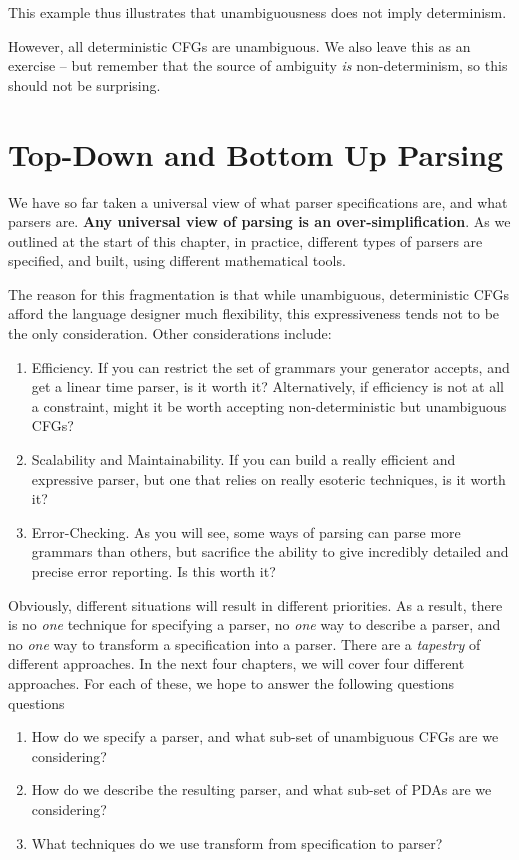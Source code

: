 This example thus illustrates that unambiguousness does not imply determinism.

However, all deterministic CFGs are unambiguous. We also leave this as an exercise -- but remember that the source of ambiguity \textit{is} non-determinism, so this should not be surprising.

\section{Top-Down and Bottom Up Parsing}
We have so far taken a universal view of what parser specifications are, and what parsers are. \textbf{Any universal view of parsing is an over-simplification}. As we outlined at the start of this chapter, in practice, different types of parsers are specified, and built, using different mathematical tools.

The reason for this fragmentation is that while unambiguous, deterministic CFGs afford the language designer much flexibility, this expressiveness  tends not to be the only consideration. Other considerations include:

\begin{enumerate}
    \item Efficiency. If you can restrict the set of grammars your generator accepts, and get a linear time parser, is it worth it? Alternatively, if efficiency is not at all a constraint, might it be worth accepting non-deterministic but unambiguous CFGs?
    \item Scalability and Maintainability. If you can build a really efficient and expressive parser, but one that relies on really esoteric techniques, is it worth it?
    \item Error-Checking. As you will see, some ways of parsing can parse more grammars than others, but sacrifice the ability to give incredibly detailed and precise error reporting. Is this worth it?
\end{enumerate}

Obviously, different situations will result in different priorities. As a result, there is no \textit{one} technique for specifying a parser, no \textit{one} way to describe a parser, and no \textit{one} way to transform a specification into a parser. There are a \textit{tapestry} of different approaches. In the next four chapters, we will cover four different approaches. For each of these, we hope to answer the following questions questions

\begin{enumerate}
    \item How do we specify a parser, and what sub-set of unambiguous CFGs are we considering?
    \item How do we describe the resulting parser, and what sub-set of PDAs are we considering?
    \item What techniques do we use transform from specification to parser?
\end{enumerate}


